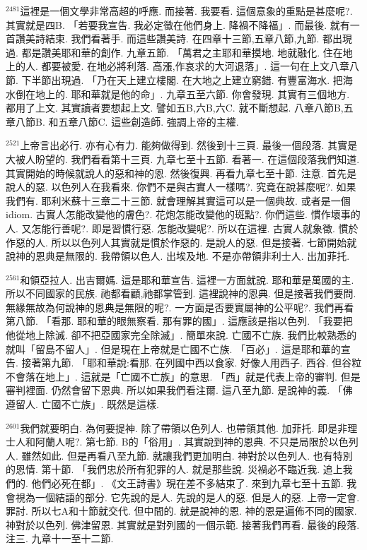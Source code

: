 \documentclass{book}
\begin{document}
$^{2481}$這裡是一個文學非常高超的呼應.
而接著.
我要看.
這個意象的重點是甚麼呢?.
其實就是四B.
「若要我宣告.
我必定徵在他們身上.
降禍不降福」.
而最後.
就有一首讚美詩結束.
我們看著手.
而這些讚美詩.
在四章十三節,五章八節,九節.
都出現過.
都是讚美耶和華的創作.
九章五節.
「萬君之主耶和華摸地.
地就融化.
住在地上的人.
都要被愛.
在地必將利落.
高漲,作哀求的大河退落」.
這一句在上文八章八節.
下半節出現過.
「乃在天上建立樓閣.
在大地之上建立窮錯.
有豐富海水.
把海水倒在地上的.
耶和華就是他的命」.
九章五至六節.
你會發現.
其實有三個地方.
都用了上文.
其實讀者要想起上文.
譬如五B,六B,六C.
就不斷想起.
八章八節B,五章八節B.
和五章八節C.
這些創造師.
強調上帝的主權.

$^{2521}$上帝言出必行.
亦有心有力.
能夠做得到.
然後到十三頁.
最後一個段落.
其實是大被人盼望的.
我們看看第十三頁.
九章七至十五節.
看著一.
在這個段落我們知道.
其實開始的時候就說人的惡和神的恩.
然後復興.
再看九章七至十節.
注意.
首先是說人的惡.
以色列人在我看來.
你們不是與古實人一樣嗎?.
究竟在說甚麼呢?.
如果我們有.
耶利米蘇十三章二十三節.
就會理解其實這可以是一個典故.
或者是一個idiom.
古實人怎能改變他的膚色?.
花炮怎能改變他的斑點?.
你們這些.
慣作壞事的人.
又怎能行善呢?.
即是習慣行惡.
怎能改變呢?.
所以在這裡.
古實人就象徵.
慣於作惡的人.
所以以色列人其實就是慣於作惡的.
是說人的惡.
但是接著.
七節開始就說神的恩典是無限的.
我帶領以色人.
出埃及地.
不是亦帶領非利士人.
出加菲托.

$^{2561}$和領亞拉人.
出吉爾媽.
這是耶和華宣告.
這裡一方面就說.
耶和華是萬國的主.
所以不同國家的民族.
祂都看顧,祂都掌管到.
這裡說神的恩典.
但是接著我們要問.
無緣無故為何說神的恩典是無限的呢?.
一方面是否要實屬神的公平呢?.
我們再看第八節.
「看那.
耶和華的眼無察看.
那有罪的國」.
這應該是指以色列.
「我要把他從地上除滅.
卻不把亞國家完全除滅」.
簡單來說.
亡國不亡族.
我們比較熟悉的就叫「留島不留人」.
但是現在上帝就是亡國不亡族.
「百必」.
這是耶和華的宣告.
接著第九節.
「耶和華說:看那.
在列國中西以食家.
好像人用西子.
西谷.
但谷粒不會落在地上」.
這就是「亡國不亡族」的意思.
「西」就是代表上帝的審判.
但是審判裡面.
仍然會留下恩典.
所以如果我們看注爾.
這八至九節.
是說神的義.
「佛遵留人.
亡國不亡族」.
既然是這樣.

$^{2601}$我們就要明白.
為何要提神.
除了帶領以色列人.
也帶領其他.
加菲托.
即是非理士人和阿蘭人呢?.
第七節.
B的「俗用」.
其實說到神的恩典.
不只是局限於以色列人.
雖然如此.
但是再看八至九節.
就讓我們更加明白.
神對於以色列人.
也有特別的恩情.
第十節.
「我們忠於所有犯罪的人.
就是那些說.
災禍必不臨近我.
追上我們的.
他們必死在都」.
《文王詩書》現在差不多結束了.
來到九章七至十五節.
我會視為一個結語的部分.
它先說的是人.
先說的是人的惡.
但是人的惡.
上帝一定會.
罪討.
所以七A和十節就交代.
但中間的.
就是說神的恩.
神的恩是遍佈不同的國家.
神對於以色列.
佛津留恩.
其實就是對列國的一個示範.
接著我們再看.
最後的段落.
注三.
九章十一至十二節.
\end{document}
